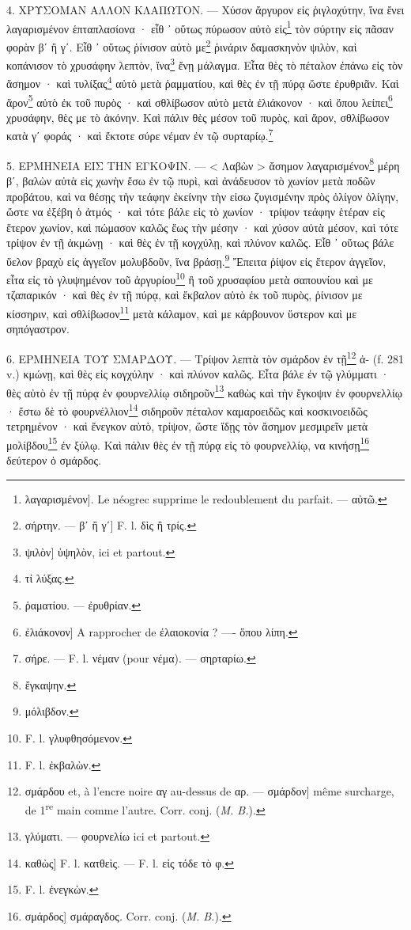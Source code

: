 \documentclass[a4paper, 11pt, oneside, polutonikogreek, french]{article}
\begin{document}
4. ΧΡΥΣΟΜΑΝ ΑΛΛΟΝ ΚΛΑΠΩΤΟΝ. --- Χύσον ἄργυρον εἰς ῥιγλοχύτην, ἵνα ἔνει λαγαρισμένον ἑπταπλασίονα · εἶθ ᾽ οὕτως πύρωσον αὐτὸ εἰς\footnote{λαγαρισμένον]. Le néogrec supprime le redoublement du parfait. --- αὐτῶ.} τὸν σύρτην εἰς πᾶσαν φορὰν βʹ ἢ γʹ. Εἶθ ᾽ οὕτως ῥίνισον αὐτὸ με\footnote{σήρτην. --- βʹ ἢ γʹ] F. l. δὶς ἢ τρίς.} ῥινάριν δαμασκηνὸν ψιλὸν, καὶ κοπάνισον τὸ χρυσάφην λεπτὸν, ἵνα\footnote{ψιλὸν] ὑψηλὸν, ici et partout.} ἔνῃ μάλαγμα. Εἶτα θὲς τὸ πέταλον ἐπάνω εἰς τὸν ἄσημον · καὶ τυλίξας\footnote{τί λύξας.} αὐτὸ μετὰ ῥαμματίου, καὶ θὲς ἐν τῇ πύρᾳ ὥστε ἐρυθριᾶν. Καὶ ἄρον\footnote{ῥαματίου. --- ἐρυθρίαν.} αὐτὸ ἐκ τοῦ πυρὸς · καὶ σθλίβωσον αὐτὸ μετὰ ἐλιάκονον · καὶ ὅπου λείπει\footnote{ἐλιάκονον] A rapprocher de ἐλαιοκονία ? ---- ὅπου λίπη.} χρυσάφην, θὲς με τὸ ἀκόνην. Καὶ πάλιν θὲς μέσον τοῦ πυρὸς, καὶ ἄρον, σθλίβωσον κατὰ γʹ φοράς · καὶ ἔκτοτε σύρε νέμαν ἐν τῷ συρταρίῳ.\footnote{σήρε. --- F. l. νέμαν (pour νέμα). --- σηρταρίω.}

5. ΕΡΜΗΝΕΙΑ ΕΙΣ ΤΗΝ ΕΓΚΟΨΙΝ. --- < Λαβὼν > ἄσημον λαγαρισμένον\footnote{ἔγκαψην.} μέρη βʹ, βαλὼν αὐτὰ εἰς χωνὴν ἔσω ἐν τῷ πυρὶ, καὶ ἀνάδευσον τὸ χωνίον μετὰ ποδῶν προβάτου, καὶ να θέσῃς τὴν τεάφην ἐκείνην τὴν εἰσω ζυγισμένην πρὸς ὀλίγον ὀλίγην, ὥστε να ἐξέβη ὁ ἀτμός · καὶ τότε βάλε εἰς τὸ χωνίον · τρίψον τεάφην ἑτέραν εἰς ἕτερον χωνίον, καὶ πώμασον καλῶς ἔως τὴν μέσην · καὶ χύσον αὐτὰ μέσον, καὶ τότε τρίψον ἐν τῇ ἀκμώνῃ · καὶ θὲς ἐν τῇ κογχύλῃ, καὶ πλύνον καλῶς. Εἷθ ᾽ οὕτως βάλε ὕελον βραχὺ εἰς ἀγγεῖον μολυβδοῦν, ἵνα βράσῃ.\footnote{μόλιβδον.} Ἔπειτα ῥίψον εἰς ἕτερον ἀγγεῖον, εἶτα εἰς τὸ γλυψημένον τοῦ ἀργυρίου\footnote{F. l. γλυφθησόμενον.} ἢ τοῦ χρυσαφίου μετὰ σαπουνίου καὶ με τζαπαρικόν · καὶ θὲς ἐν τῇ πύρᾳ, καὶ ἔκβαλον αὐτὸ ἐκ τοῦ πυρὸς, ῥίνισον με κίσσηριν, καὶ σθλίβωσον\footnote{F. l. ἐκβαλὼν.} μετὰ κάλαμον, καὶ με κάρβουνον ὕστερον καὶ με σηπόγαστρον.

6. ΕΡΜΗΝΕΙΑ ΤΟΥ ΣΜΑΡΔΟΥ. --- Τρίψον λεπτὰ τὸν σμάρδον ἐν τῇ\footnote{σμάρδου et, à l'encre noire αγ au-dessus de αρ. --- σμάρδον] même surcharge, de 1\textsuperscript{re} main comme l'autre. Corr. conj. (\emph{M. B.}).} ἀ- (f. 281 v.) κμώνῃ, καὶ θὲς εἰς κογχύλην · καὶ πλύνον καλῶς. Εἶτα βάλε ἐν τῷ γλύμματι · θὲς αὐτὸ ἐν τῇ πύρᾳ ἐν φουρνελλίῳ σιδηροῦν\footnote{γλύματι. --- φουρνελίω ici et partout.} καθὼς καὶ τὴν ἔγκοψιν ἐν φουρνελλίῳ · ἔστω δὲ τὸ φουρνέλλιον\footnote{καθὼς] F. l. κατθεὶς. --- F. l. εἰς τόδε τὸ φ.} σιδηροῦν πέταλον καμαροειδῶς καὶ κοσκινοειδῶς τετρημένον · καὶ ἔνεγκον αὐτὸ, τρίψον, ὥστε ἴδῃς τὸν ἄσημον μεσμιρεῖν μετὰ μολίβδου\footnote{F. l. ἐνεγκὼν.} ἐν ξύλῳ. Καὶ πάλιν θὲς ἐν τῇ πύρᾳ εἰς τὸ φουρνελλίῳ, να κινήσῃ\footnote{σμάρδος] σμάραγδος. Corr. conj. (\emph{M. B.}).} δεύτερον ὁ σμάρδος.
\end{document}
